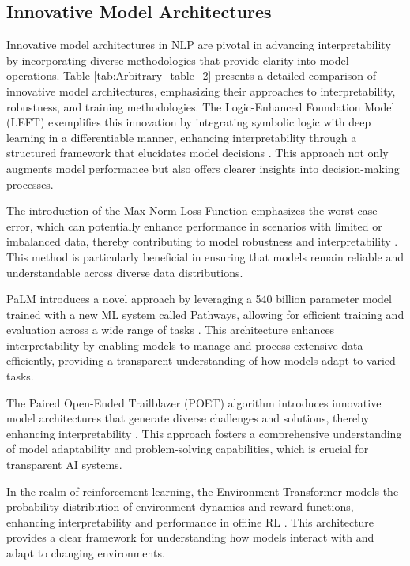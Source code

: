 \subsection{Innovative Model Architectures} \label{subsec:Innovative Model Architectures}



Innovative model architectures in NLP are pivotal in advancing interpretability by incorporating diverse methodologies that provide clarity into model operations. Table \ref{tab:Arbitrary_table_2} presents a detailed comparison of innovative model architectures, emphasizing their approaches to interpretability, robustness, and training methodologies. The Logic-Enhanced Foundation Model (LEFT) exemplifies this innovation by integrating symbolic logic with deep learning in a differentiable manner, enhancing interpretability through a structured framework that elucidates model decisions \cite{hsu2023whatsleftconceptgrounding}. This approach not only augments model performance but also offers clearer insights into decision-making processes.

The introduction of the Max-Norm Loss Function emphasizes the worst-case error, which can potentially enhance performance in scenarios with limited or imbalanced data, thereby contributing to model robustness and interpretability \cite{peiris2021deeplearningnonsmoothobjectives}. This method is particularly beneficial in ensuring that models remain reliable and understandable across diverse data distributions.

PaLM introduces a novel approach by leveraging a 540 billion parameter model trained with a new ML system called Pathways, allowing for efficient training and evaluation across a wide range of tasks \cite{chowdhery2023palm}. This architecture enhances interpretability by enabling models to manage and process extensive data efficiently, providing a transparent understanding of how models adapt to varied tasks.

The Paired Open-Ended Trailblazer (POET) algorithm introduces innovative model architectures that generate diverse challenges and solutions, thereby enhancing interpretability \cite{wang2019pairedopenendedtrailblazerpoet}. This approach fosters a comprehensive understanding of model adaptability and problem-solving capabilities, which is crucial for transparent AI systems.

In the realm of reinforcement learning, the Environment Transformer models the probability distribution of environment dynamics and reward functions, enhancing interpretability and performance in offline RL \cite{wang2023environmenttransformerpolicyoptimization}. This architecture provides a clear framework for understanding how models interact with and adapt to changing environments.


